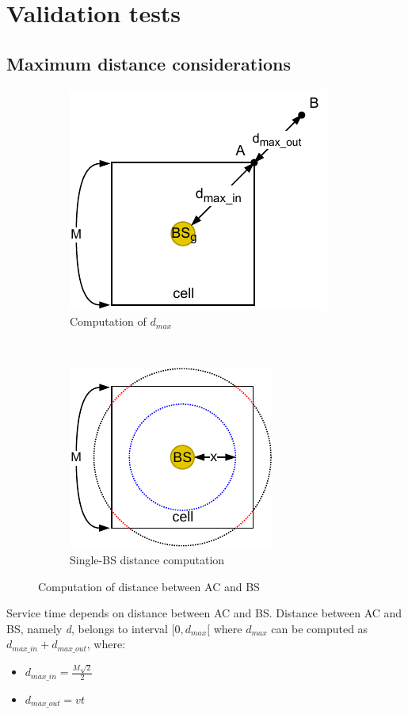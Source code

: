 \documentclass[a4paper,12pt]{article}
\begin{document}
\section{Validation tests}
\subsection{Maximum distance considerations}
\label{sec:max-distance-considerations}
\begin{figure}[H]
  \centering
  \begin{subfigure}[b]{0.45\textwidth}
    \centering
    \includegraphics{img/dmax.pdf}
    \caption{Computation of $d_{max}$}
    \label{fig:dmax}
  \end{subfigure}
  ~
  \begin{subfigure}[b]{0.45\textwidth}
    \centering
    \includegraphics{img/d-simplified.pdf}
    \caption{Single-BS distance computation}
    \label{fig:d-simplified}
  \end{subfigure}
  \caption{Computation of distance between AC and BS}
  \label{fig:d}
\end{figure}

Service time depends on distance between AC and BS.
Distance between AC and BS, namely \emph{d}, belongs to interval $[ 0, d_{max} [$ where $d_{max}$ can be computed as $d_{max\_in} + d_{max\_out}$, where:
\begin{itemize}
  \item $d_{max\_in} = \frac{M \sqrt{2}}{2} $
  \item $d_{max\_out} = vt$
\end{itemize}
\end{document}
